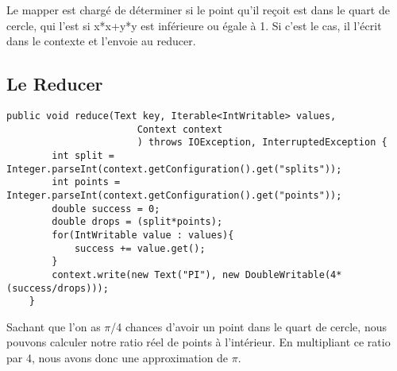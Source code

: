 \documentclass[a4paper]{article}
\begin{document}
Le mapper est chargé de déterminer si le point qu'il reçoit est dans le quart de cercle, qui l'est si x*x+y*y est inférieure ou égale à 1. Si c'est le cas, il l'écrit dans le contexte et l'envoie au reducer.

\subsection{Le Reducer}
\begin{lstlisting}
public void reduce(Text key, Iterable<IntWritable> values,
                       Context context
                       ) throws IOException, InterruptedException {
        int split = Integer.parseInt(context.getConfiguration().get("splits"));
        int points = Integer.parseInt(context.getConfiguration().get("points"));
        double success = 0;
        double drops = (split*points);
        for(IntWritable value : values){
            success += value.get();
        }
        context.write(new Text("PI"), new DoubleWritable(4*(success/drops)));
    }
\end{lstlisting}
Sachant que l'on as $\pi$/4 chances d'avoir un point dans le quart de cercle, nous pouvons calculer notre ratio réel de points à l'intérieur. En multipliant ce ratio par 4, nous avons donc une approximation de $\pi$.
\end{document}
